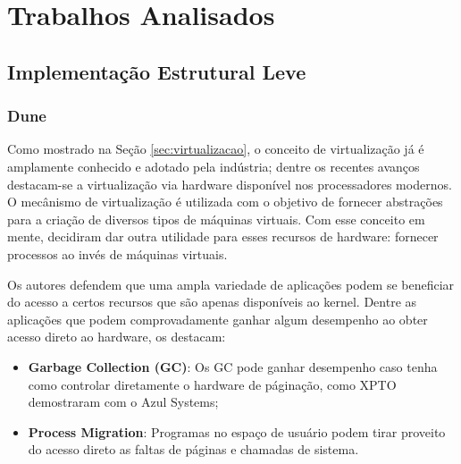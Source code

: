 \chapter{Trabalhos Analisados}
\label{cap:trabalhos-analisados}

\section{Implementação Estrutural Leve}

\subsection{Dune}

Como mostrado na Seção \ref{sec:virtualizacao},  o conceito de virtualização já
é amplamente conhecido e adotado pela indústria; dentre os recentes avanços
destacam-se a virtualização via hardware disponível nos processadores modernos.
O mecânismo de virtualização é utilizada com o objetivo de fornecer abstrações
para a criação de diversos tipos de máquinas virtuais. Com esse conceito em
mente, \citep{belay} decidiram dar outra utilidade para esses recursos de
hardware: fornecer processos ao invés de máquinas virtuais.

Os autores defendem que uma ampla variedade de aplicações podem se beneficiar
do acesso a certos recursos que são apenas disponíveis ao kernel. Dentre as
aplicações que podem comprovadamente ganhar algum desempenho ao obter acesso
direto ao hardware, os destacam:

\begin{itemize}
  \item \textbf{Garbage Collection (GC)}: Os GC pode ganhar desempenho caso
        tenha como controlar diretamente o hardware de páginação, como XPTO
        demostraram com o Azul Systems;
  \item \textbf{Process Migration}: Programas no espaço de usuário podem tirar
        proveito do acesso direto as faltas de páginas e chamadas de sistema.
\end{itemize}

